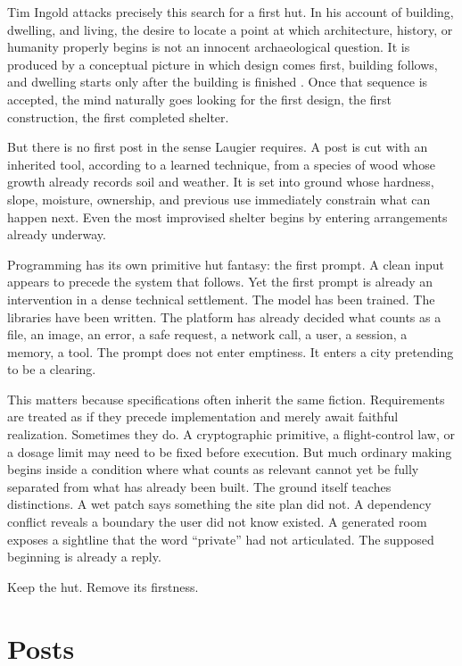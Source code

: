 \documentclass[11pt]{article}
\begin{document}
Tim Ingold attacks precisely this search for a first hut. In his account of building, dwelling, and living, the desire to locate a point at which architecture, history, or humanity properly begins is not an innocent archaeological question. It is produced by a conceptual picture in which design comes first, building follows, and dwelling starts only after the building is finished \cite{ingold2000}. Once that sequence is accepted, the mind naturally goes looking for the first design, the first construction, the first completed shelter.

But there is no first post in the sense Laugier requires. A post is cut with an inherited tool, according to a learned technique, from a species of wood whose growth already records soil and weather. It is set into ground whose hardness, slope, moisture, ownership, and previous use immediately constrain what can happen next. Even the most improvised shelter begins by entering arrangements already underway.

Programming has its own primitive hut fantasy: the first prompt. A clean input appears to precede the system that follows. Yet the first prompt is already an intervention in a dense technical settlement. The model has been trained. The libraries have been written. The platform has already decided what counts as a file, an image, an error, a safe request, a network call, a user, a session, a memory, a tool. The prompt does not enter emptiness. It enters a city pretending to be a clearing.

This matters because specifications often inherit the same fiction. Requirements are treated as if they precede implementation and merely await faithful realization. Sometimes they do. A cryptographic primitive, a flight-control law, or a dosage limit may need to be fixed before execution. But much ordinary making begins inside a condition where what counts as relevant cannot yet be fully separated from what has already been built. The ground itself teaches distinctions. A wet patch says something the site plan did not. A dependency conflict reveals a boundary the user did not know existed. A generated room exposes a sightline that the word ``private'' had not articulated. The supposed beginning is already a reply.

Keep the hut. Remove its firstness.

\section*{Posts}
\end{document}
